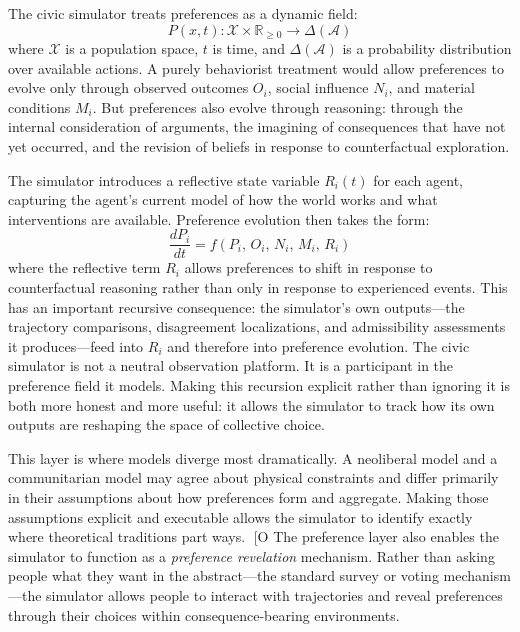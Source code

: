 \documentclass[12pt]{article}
\begin{document}
The civic simulator treats preferences as a dynamic field:
\begin{equation}
  P(x, t) : \mathcal{X} \times \mathbb{R}_{\geq 0} \to \Delta(\mathcal{A})
\end{equation}
where $\mathcal{X}$ is a population space, $t$ is time, and $\Delta(\mathcal{A})$ is a probability distribution over available actions. A purely behaviorist treatment would allow preferences to evolve only through observed outcomes $O_i$, social influence $N_i$, and material conditions $M_i$. But preferences also evolve through reasoning: through the internal consideration of arguments, the imagining of consequences that have not yet occurred, and the revision of beliefs in response to counterfactual exploration.

The simulator introduces a reflective state variable $R_i(t)$ for each agent, capturing the agent's current model of how the world works and what interventions are available. Preference evolution then takes the form:
\begin{equation}
  \frac{dP_i}{dt} = f(P_i,\, O_i,\, N_i,\, M_i,\, R_i)
\end{equation}
where the reflective term $R_i$ allows preferences to shift in response to counterfactual reasoning rather than only in response to experienced events. This has an important recursive consequence: the simulator's own outputs---the trajectory comparisons, disagreement localizations, and admissibility assessments it produces---feed into $R_i$ and therefore into preference evolution. The civic simulator is not a neutral observation platform. It is a participant in the preference field it models. Making this recursion explicit rather than ignoring it is both more honest and more useful: it allows the simulator to track how its own outputs are reshaping the space of collective choice.

This layer is where models diverge most dramatically. A neoliberal model and a communitarian model may agree about physical constraints and differ primarily in their assumptions about how preferences form and aggregate. Making those assumptions explicit and executable allows the simulator to identify exactly where theoretical traditions part ways.
[O
The preference layer also enables the simulator to function as a \emph{preference revelation} mechanism. Rather than asking people what they want in the abstract---the standard survey or voting mechanism---the simulator allows people to interact with trajectories and reveal preferences through their choices within consequence-bearing environments.
\end{document}
